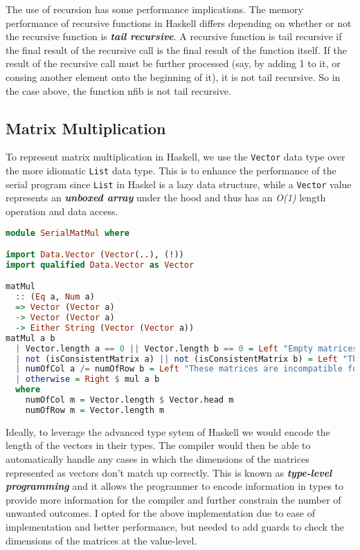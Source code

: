 \documentclass[a4paper, 10pt]{article}
\begin{document}
The use of recursion has some performance implications. The memory performance of recursive functions in Haskell differs depending on whether or not the recursive function is \textbf{\textit{tail recursive}}. A recursive function is tail recursive if the final result of the recursive call is the final result of the function itself. If the result of the recursive call must be further processed (say, by adding 1 to it, or consing another element onto the beginning of it), it is not tail recursive. So in the case above, the function nfib is not tail recursive.

\subsection{Matrix Multiplication}

To represent matrix multiplication in Haskell, we use the \lstinline{Vector} data type over the more idiomatic \lstinline{List} data type. This is to enhance the performance of the serial program since \lstinline{List} in Haskel is a lazy data structure,  while a \lstinline{Vector} value represents an \textbf{\textit{unboxed array}} under the hood and thus has an \textit{O(1)} length operation and data access.

\begin{lstlisting}[language=Haskell, caption=Haskell Fibonacci]
module SerialMatMul where

import Data.Vector (Vector(..), (!))
import qualified Data.Vector as Vector

matMul
  :: (Eq a, Num a)
  => Vector (Vector a)
  -> Vector (Vector a)
  -> Either String (Vector (Vector a))
matMul a b
  | Vector.length a == 0 || Vector.length b == 0 = Left "Empty matrices can't be used"
  | not (isConsistentMatrix a) || not (isConsistentMatrix b) = Left "The dimensions of the matrices are inconsistent"
  | numOfCol a /= numOfRow b = Left "These matrices are incompatible for multiplication"
  | otherwise = Right $ mul a b
  where
    numOfCol m = Vector.length $ Vector.head m
    numOfRow m = Vector.length m
\end{lstlisting}

Ideally, to leverage the advanced type sytem of Haskell we would encode the length of the vectors in their types. The compiler would then be able to automatically handle any cases in which the dimensions of the matrices represented as vectors don't match up correctly. This is known as \textbf{\textit{type-level programming}} and it allows the programmer to encode information in types to provide more information for the compiler and further constrain the number of unwanted outcomes. I opted for the above implementation due to ease of implementation and better performance, but needed to add guards to check the dimensions of the matrices at the value-level.
\end{document}
